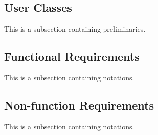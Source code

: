 \documentclass[11pt]{article}
\theoremstyle{plain}
\theoremstyle{definition}
\begin{document}
\subsection{User Classes}\label{sec:userclasses}
This is a subsection containing preliminaries.

\subsection{Functional Requirements}\label{sec:funcrequirements}
This is a subsection containing notations.

\subsection{Non-function Requirements}\label{sec:nonfuncrequirements}
This is a subsection containing notations.
\end{document}
